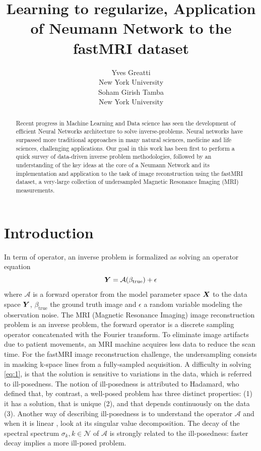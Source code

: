 \documentclass{article}
\title{Learning to regularize, Application of Neumann Network to the fastMRI dataset}
\author{%
  Yves Greatti \\
  New York University\\
   \And
    Soham Girish Tamba \\
    New York University\\
}
\begin{document}
\maketitle

\begin{abstract}
 Recent progress in Machine Learning and Data science has seen the development of efficient Neural Networks architecture to solve inverse-problems. Neural networks have surpassed more traditional approaches in 
  many natural sciences, medicine and life sciences, challenging applications.
 Our goal in this work has been first to perform a quick survey of data-driven inverse problem methodologies, followed by an understanding of the key ideas at the core of a Neumann Network and its implementation
 and application to the task of image reconstruction using the fastMRI dataset, a very-large collection of  undersampled Magnetic Resonance Imaging (MRI) measurements. 

  \end{abstract}
  
 \section{Introduction}
\label{Introduction}

In term of operator, an inverse problem is formalized as solving an operator equation
\begin{equation}
	\bm{Y} = \mathcal{A} (\beta_{\text{true}}) + \epsilon \label{eq:1}
\end{equation}
where $\mathcal{A}$ is a forward operator from the model parameter space $\bm{X}$ to the data space $\bm{Y}$,  $\beta_{\text{true}}$ the ground truth image and $\epsilon$ a random variable modeling the observation noise.
 The MRI (Magnetic Resonance Imaging) image reconstruction problem is an inverse problem, the forward operator is a discrete sampling operator concatenated with the Fourier transform.
 To eliminate image artifacts due to patient movements, an MRI machine acquires less data to reduce the scan time.
For the fastMRI image reconstruction challenge, the undersampling consists  in masking k-space lines from a fully-sampled acquisition.
A difficulty in solving  \eqref{eq:1}, is that the solution is sensitive to variations in the data, which is referred to ill-posedness. The notion of  ill-posedness is attributed to Hadamard, who defined that, by contrast, a well-posed problem
has three distinct properties: (1) it has a solution, that is unique (2), and that depends continuously on the data (3). Another way of describing  ill-posedness is to understand the operator  $\mathcal{A}$ and when it is linear , look at its singular
value decomposition. The decay of the spectral spectrum $\sigma_k, k \in \mathcal{N}$ of  $\mathcal{A}$ is strongly related to the ill-posedness: faster decay implies a more ill-posed problem. 
 	
\end{document}
